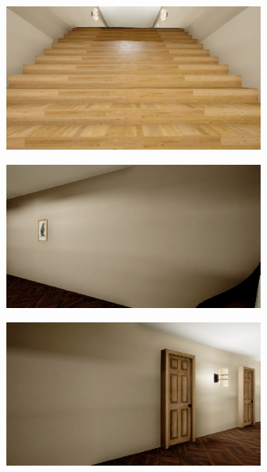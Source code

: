 \begin{figure}[H]
\begin{subfigure}{0.32\textwidth}
        \vspace{0.5em}
    \end{subfigure}
    \begin{subfigure}{0.32\textwidth}
        \centering
        \includegraphics[width=\textwidth]{resources/png/06/classification/datasets/3.png}
        \vspace{0.5em}
    \end{subfigure}
    \hfill
    \begin{subfigure}{0.32\textwidth}
        \centering
        \includegraphics[width=\textwidth]{resources/png/06/classification/datasets/4.png}
        \vspace{0.5em}
    \end{subfigure}
    \hfill
    \begin{subfigure}{0.32\textwidth}
        \centering
        \includegraphics[width=\textwidth]{resources/png/06/classification/datasets/5.png}

\end{subfigure}
\end{figure}
